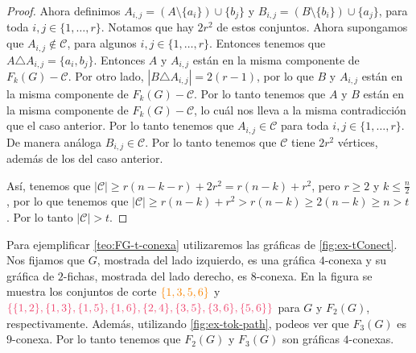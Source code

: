 \begin{proof}
Ahora definimos $A_{i,j} = (A\setminus \{a_i\}) \cup \{b_j\}$ y $B_{i,j} =
(B\setminus \{b_i\}) \cup \{a_j\}$, para toda $ i, j \in \{1, \dots, r\}$.
Notamos que hay $2r^2$ de estos conjuntos. Ahora supongamos que $A_{i,j} \notin
\mathcal{C}$, para algunos $ i, j \in \{1, \dots, r\}$. Entonces tenemos que $A
\triangle A_{i,j} = \{a_i, b_j\}$. Entonces $A$ y $A_{i,j}$ est\'an en la misma
componente de $F_k(G)- \mathcal{C}$. Por otro lado, $|B \triangle A_{i,j}| = 2
(r-1)$, por lo que $B$ y $A_{i,j}$ est\'an en la misma componente de $F_k(G) -
\mathcal{C}$. Por lo tanto tenemos que $A$ y $B$ est\'an en la misma componente
de $F_k(G)-\mathcal{C}$, lo cu\'al nos lleva a la misma contradicci\'on que el
caso anterior. Por lo tanto tenemos que $A_{i,j} \in \mathcal{C}$ para toda $i,
j \in \{1, \dots, r\}$. De manera an\'aloga $B_{i,j} \in \mathcal{C}$. Por lo
tanto tenemos que $\mathcal{C}$ tiene $2r^2$ v\'ertices, adem\'as de los del
caso anterior.

As\'i, tenemos que $|\mathcal{C}|\geq r(n-k-r)+2r^2 = r(n-k) + r^2$, pero $r
\geq 2$ y $k \leq \frac{n}{2}$, por lo que tenemos que $|\mathcal{C}| \geq
r(n-k)+r^2 > r(n-k) \geq 2(n-k) \geq n >t$. Por lo tanto $|\mathcal{C}|>t$.
\end{proof} 

Para ejemplificar \cref{teo:FG-t-conexa} utilizaremos las gr\'aficas de
\cref{fig:ex-tConect}. Nos fijamos que $G$, mostrada del lado izquierdo, es una
gr\'afica $4$-conexa y su gr\'afica de $2$-fichas, mostrada del lado derecho, es
$8$-conexa. En la figura se muestra los conjuntos de corte
${\color{naranja}\{1,3,5,6\}}$ y
${\color{fushia}\{\{1,2\},\{1,3\},\{1,5\},\{1,6\},\{2,4\},\{3,5\},\{3,6\},\{5,6\}\}}$
para $G$ y $F_2(G)$, respectivamente. Adem\'as, utilizando
\cref{fig:ex-tok-path}, podeos ver que $F_3(G)$ es $9$-conexa. Por lo tanto
tenemos que $F_2(G)$ y $F_3(G)$ son gr\'aficas $4$-conexas.

